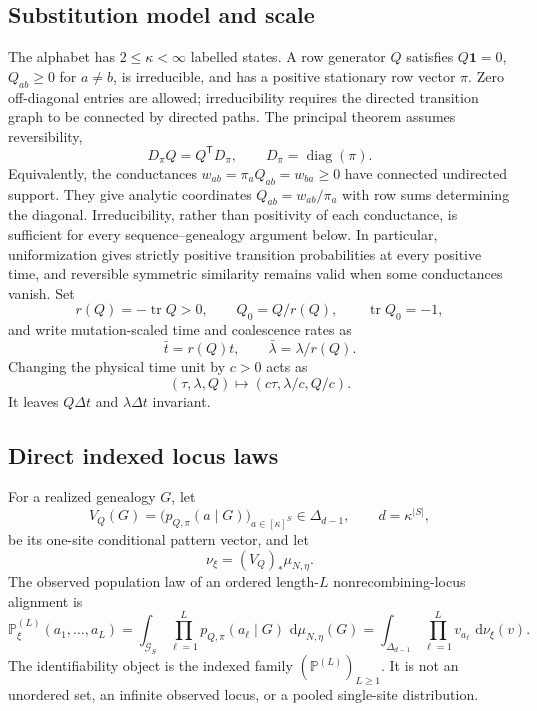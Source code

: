 \documentclass[11pt]{article}
\newcommand{\diag}{\operatorname{diag}}
\newcommand{\tr}{\operatorname{tr}}
\newcommand{\one}{\mathbf 1}
\newcommand{\dd}{\,\mathrm d}
\newcommand{\cG}{\mathcal G}
\begin{document}
\subsection{Substitution model and scale}

The alphabet has $2\le\kappa<\infty$ labelled states.  A row generator $Q$ satisfies $Q\one=0$, $Q_{ab}\ge0$ for $a\ne b$, is irreducible, and has a positive stationary row vector $\pi$.  Zero off-diagonal entries are allowed; irreducibility requires the directed transition graph to be connected by directed paths.  The principal theorem assumes reversibility,
\[
D_\pi Q=Q^{\mathsf T}D_\pi,\qquad D_\pi=\diag(\pi).
\]
Equivalently, the conductances $w_{ab}=\pi_aQ_{ab}=w_{ba}\ge0$ have connected undirected support.  They give analytic coordinates $Q_{ab}=w_{ab}/\pi_a$ with row sums determining the diagonal.  Irreducibility, rather than positivity of each conductance, is sufficient for every sequence--genealogy argument below.  In particular, uniformization gives strictly positive transition probabilities at every positive time, and reversible symmetric similarity remains valid when some conductances vanish.
Set
\[
r(Q)=-\tr Q>0,\qquad Q_0=Q/r(Q),\qquad \tr Q_0=-1,
\]
and write mutation-scaled time and coalescence rates as
\[
\bar t=r(Q)t,\qquad \bar\lambda=\lambda/r(Q).
\]
Changing the physical time unit by $c>0$ acts as
\begin{equation}
(\tau,\lambda,Q)\longmapsto(c\tau,\lambda/c,Q/c).
\label{eq:gauge}
\end{equation}
It leaves $Q\Delta t$ and $\lambda\Delta t$ invariant.

\subsection{Direct indexed locus laws}

For a realized genealogy $G$, let
\[
V_Q(G)=\bigl(p_{Q,\pi}(a\mid G)\bigr)_{a\in[\kappa]^S}\in\Delta_{d-1},
\qquad d=\kappa^{|S|},
\]
be its one-site conditional pattern vector, and let
\[
\nu_\xi=(V_Q)_*\mu_{N,\eta}.
\]
The observed population law of an ordered length-$L$ nonrecombining-locus alignment is
\begin{equation}
\mathbb P_\xi^{(L)}(a_1,\ldots,a_L)
 =\int_{\cG_S}\prod_{\ell=1}^L p_{Q,\pi}(a_\ell\mid G)\,\dd\mu_{N,\eta}(G)
 =\int_{\Delta_{d-1}}\prod_{\ell=1}^L v_{a_\ell}\,\dd\nu_\xi(v).
\label{eq:locus}
\end{equation}
The identifiability object is the indexed family $(\mathbb P^{(L)})_{L\ge1}$.  It is not an unordered set, an infinite observed locus, or a pooled single-site distribution.
\end{document}
